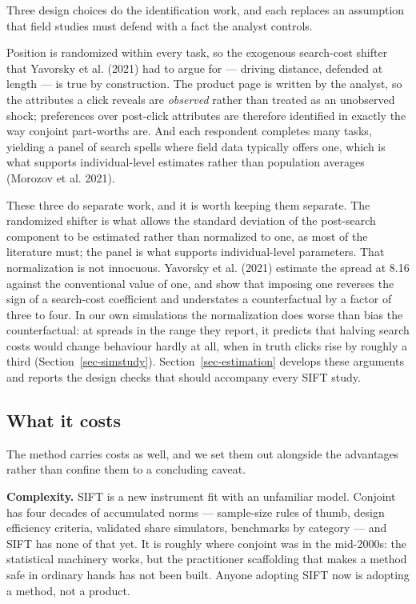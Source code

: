 \documentclass[
  letterpaper,
  DIV=11,
  numbers=noendperiod]{scrartcl}
\newcounter{none} %
\begin{document}
Three design choices do the identification work, and each replaces an
assumption that field studies must defend with a fact the analyst
controls.

Position is randomized within every task, so the exogenous search-cost
shifter that Yavorsky et al. (2021) had to argue for --- driving
distance, defended at length --- is true by construction. The product
page is written by the analyst, so the attributes a click reveals are
\emph{observed} rather than treated as an unobserved shock; preferences
over post-click attributes are therefore identified in exactly the way
conjoint part-worths are. And each respondent completes many tasks,
yielding a panel of search spells where field data typically offers one,
which is what supports individual-level estimates rather than population
averages (Morozov et al. 2021).

These three do separate work, and it is worth keeping them separate. The
randomized shifter is what allows the standard deviation of the
post-search component to be estimated rather than normalized to one, as
most of the literature must; the panel is what supports individual-level
parameters. That normalization is not innocuous. Yavorsky et al. (2021)
estimate the spread at 8.16 against the conventional value of one, and
show that imposing one reverses the sign of a search-cost coefficient
and understates a counterfactual by a factor of three to four. In our
own simulations the normalization does worse than bias the
counterfactual: at spreads in the range they report, it predicts that
halving search costs would change behaviour hardly at all, when in truth
clicks rise by roughly a third (Section~\ref{sec-simstudy}).
Section~\ref{sec-estimation} develops these arguments and reports the
design checks that should accompany every SIFT study.

\subsection{What it costs}\label{what-it-costs}

The method carries costs as well, and we set them out alongside the
advantages rather than confine them to a concluding caveat.

\textbf{Complexity.} SIFT is a new instrument fit with an unfamiliar
model. Conjoint has four decades of accumulated norms --- sample-size
rules of thumb, design efficiency criteria, validated share simulators,
benchmarks by category --- and SIFT has none of that yet. It is roughly
where conjoint was in the mid-2000s: the statistical machinery works,
but the practitioner scaffolding that makes a method safe in ordinary
hands has not been built. Anyone adopting SIFT now is adopting a method,
not a product.
\end{document}
